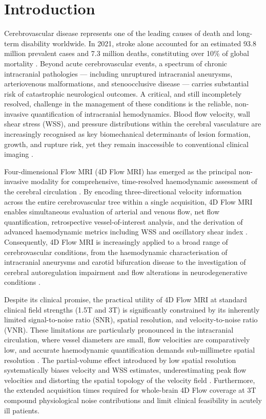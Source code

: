 \section*{Introduction}

Cerebrovascular disease represents one of the leading causes of death and long-term disability worldwide. In 2021, stroke alone accounted for an estimated 93.8 million prevalent cases and 7.3 million deaths, constituting over 10\% of global mortality \cite{wso2025,gbd2021stroke}. Beyond acute cerebrovascular events, a spectrum of chronic intracranial pathologies --- including unruptured intracranial aneurysms, arteriovenous malformations, and stenoocclusive disease --- carries substantial risk of catastrophic neurological outcomes. A critical, and still incompletely resolved, challenge in the management of these conditions is the reliable, non-invasive quantification of intracranial hemodynamics. Blood flow velocity, wall shear stress (WSS), and pressure distributions within the cerebral vasculature are increasingly recognised as key biomechanical determinants of lesion formation, growth, and rupture risk, yet they remain inaccessible to conventional clinical imaging \cite{wahlin2022,cebral2019wss}.

Four-dimensional Flow MRI (4D Flow MRI) has emerged as the principal non-invasive modality for comprehensive, time-resolved haemodynamic assessment of the cerebral circulation \cite{markl2012,dyverfeldt2015}. By encoding three-directional velocity information across the entire cerebrovascular tree within a single acquisition, 4D Flow MRI enables simultaneous evaluation of arterial and venous flow, net flow quantification, retrospective vessel-of-interest analysis, and the derivation of advanced haemodynamic metrics including WSS and oscillatory shear index \cite{bock2010,stienen2020wss}. Consequently, 4D Flow MRI is increasingly applied to a broad range of cerebrovascular conditions, from the haemodynamic characterisation of intracranial aneurysms and carotid bifurcation disease to the investigation of cerebral autoregulation impairment and flow alterations in neurodegenerative conditions \cite{wahlin2022,sun2020cfd}.

Despite its clinical promise, the practical utility of 4D Flow MRI at standard clinical field strengths (1.5T and 3T) is significantly constrained by its inherently limited signal-to-noise ratio (SNR), spatial resolution, and velocity-to-noise ratio (VNR). These limitations are particularly pronounced in the intracranial circulation, where vessel diameters are small, flow velocities are comparatively low, and accurate haemodynamic quantification demands sub-millimetre spatial resolution \cite{markl2012,dyverfeldt2015}. The partial-volume effect introduced by low spatial resolution systematically biases velocity and WSS estimates, underestimating peak flow velocities and distorting the spatial topology of the velocity field \cite{sun2020cfd}. Furthermore, the extended acquisition times required for whole-brain 4D Flow coverage at 3T compound physiological noise contributions and limit clinical feasibility in acutely ill patients.

